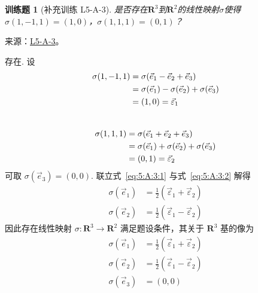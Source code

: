 \documentclass[12pt,fontset=fandol]{ctexart}
\newtheorem{exercise}{训练题}[section]
\begin{document}
\begin{exercise}[补充训练 L5-A-3]\label{prob:L5-A-3}
是否存在$\mathbf{R}^3$到$\mathbf{R}^2$的线性映射$\sigma$使得$\sigma(1,-1,1)=(1,0)$，$\sigma(1,1,1)=(0,1)$？
\end{exercise}
\noindent 来源：\href{https://github.com/yhwu-is/Linear-Algebra-Left-Undone/blob/new/%E8%AE%B2%E4%B9%89/%E4%B8%93%E9%A2%98/5%20%E7%BA%BF%E6%80%A7%E6%98%A0%E5%B0%84.tex}{L5-A-3}。
\begin{solve}
存在. 设
          \begin{align}
              \sigma(1, -1, 1) & = \sigma(\vec{e}_1 - \vec{e}_2 + \vec{e}_3) \notag                 \\
                               & = \sigma(\vec{e}_1) - \sigma(\vec{e}_2) + \sigma(\vec{e}_3) \notag \\
                               & = (1, 0) = \vec{\varepsilon}_1 \label{eq:5:A:3:1}
          \end{align} \\
          \begin{align}
              \sigma(1, 1, 1) & = \sigma(\vec{e}_1 + \vec{e}_2 + \vec{e}_3) \notag                 \\
                              & = \sigma(\vec{e}_1) + \sigma(\vec{e}_2) + \sigma(\vec{e}_3) \notag \\
                              & = (0, 1) = \vec{\varepsilon}_2 \label{eq:5:A:3:2}
          \end{align}
          可取 $ \sigma(\vec{e}_3) = (0, 0) $. 联立式~\eqref{eq:5:A:3:1} 与式~\eqref{eq:5:A:3:2} 解得
          \begin{align*}
              \sigma(\vec{e}_1) & = \frac{1}{2} (\vec{\varepsilon}_1 + \vec{\varepsilon}_2) \\
              \sigma(\vec{e}_2) & = \frac{1}{2} (\vec{\varepsilon}_1 - \vec{\varepsilon}_2)
          \end{align*}
          因此存在线性映射 $ \sigma : \mathbf{R}^3 \to \mathbf{R}^2 $ 满足题设条件，其关于 $ \mathbf{R}^3 $ 基的像为
          \begin{align*}
              \sigma(\vec{e}_1) & = \frac{1}{2} (\vec{\varepsilon}_1 + \vec{\varepsilon}_2) \\
              \sigma(\vec{e}_2) & = \frac{1}{2} (\vec{\varepsilon}_1 - \vec{\varepsilon}_2) \\
              \sigma(\vec{e}_3) & = (0, 0)
          \end{align*}
\end{solve}
\end{document}
